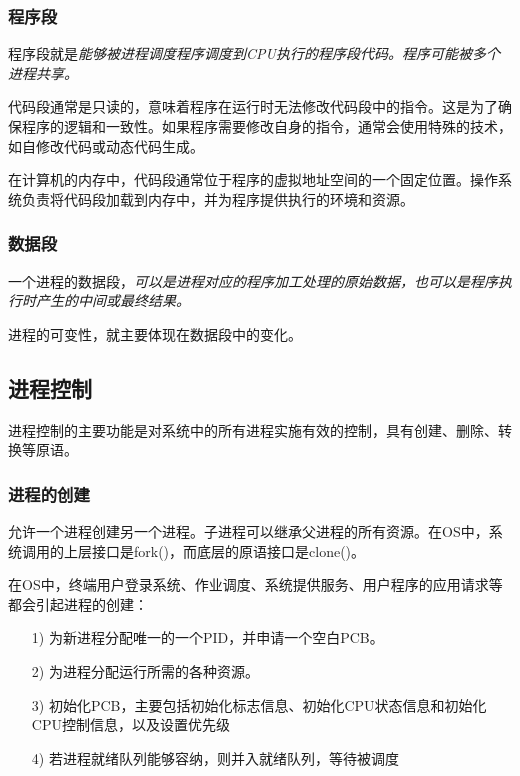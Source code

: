 \subsubsection{程序段}

    程序段就是\emph{能够被进程调度程序调度到CPU执行的程序段代码。程序可能被多个进程共享。}

    代码段通常是只读的，意味着程序在运行时无法修改代码段中的指令。这是为了确保程序的逻辑和一致性。如果程序需要修改自身的指令，通常会使用特殊的技术，如自修改代码或动态代码生成。

    在计算机的内存中，代码段通常位于程序的虚拟地址空间的一个固定位置。操作系统负责将代码段加载到内存中，并为程序提供执行的环境和资源。

\subsubsection{数据段}

    一个进程的数据段，\emph{可以是进程对应的程序加工处理的原始数据，也可以是程序执行时产生的中间或最终结果。}

    进程的可变性，就主要体现在数据段中的变化。

\subsection{进程控制}

    进程控制的主要功能是对系统中的所有进程实施有效的控制，具有创建、删除、转换等原语。

\subsubsection{进程的创建}

    允许一个进程创建另一个进程。子进程可以继承父进程的所有资源。在OS中，系统调用的上层接口是fork()，而底层的原语接口是clone()。

    在OS中，终端用户登录系统、作业调度、系统提供服务、用户程序的应用请求等都会引起进程的创建：

\begin{itemize}
    \item [1)] 为新进程分配唯一的一个PID，并申请一个空白PCB。
    \item [2)] 为进程分配运行所需的各种资源。
    \item [3)] 初始化PCB，主要包括初始化标志信息、初始化CPU状态信息和初始化CPU控制信息，以及设置优先级
    \item [4)] 若进程就绪队列能够容纳，则并入就绪队列，等待被调度
\end{itemize}

